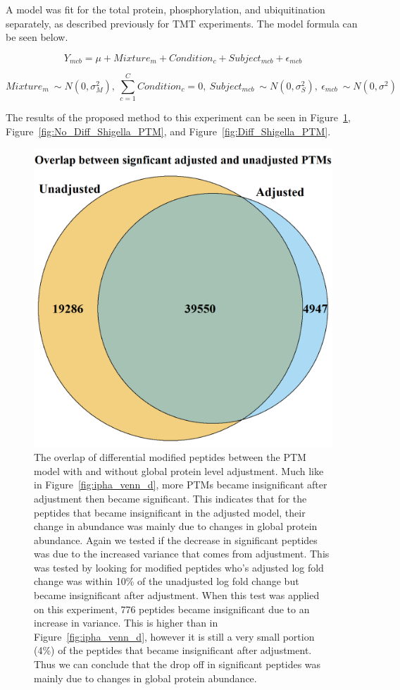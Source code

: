 \documentclass{mcp}
\def\sfigref#1{{Figure~\ref{#1}}}
\begin{document}
A model was fit for the total protein, phosphorylation, and ubiquitination separately, as described previously for TMT experiments. The model formula can be seen below.

$$Y_{mcb} = \mu + Mixture_m + Condition_c + Subject_{mcb} + \epsilon_{mcb}$$

$$Mixture_m ~ \sim N(0, \sigma^2_M) ,\: \sum_{c=1}^C{Condition_c} = 0 ,\: Subject_{mcb} ~ \sim N(0, \sigma^2_S) ,\: \epsilon_{mcb} ~ \sim N(0, \sigma^2)$$

The results of the proposed method to this experiment can be seen in \sfigref{fig:shig_venn_d},  \sfigref{fig:No_Diff_Shigella_PTM}, and \sfigref{fig:Diff_Shigella_PTM}.

\begin{figure}[h!]
\centering
\includegraphics[height=.65\textwidth]{sim_new/shig_venn_diagramm.png}
\caption{The overlap of differential modified peptides between the PTM model with and without global protein level adjustment. Much like in \sfigref{fig:ipha_venn_d}, more PTMs became insignificant after adjustment then became significant. This indicates that for the peptides that became insignificant in the adjusted model, their change in abundance was mainly due to changes in global protein abundance. Again we tested if the decrease in significant peptides was due to the increased variance that comes from adjustment. This was tested by looking for modified peptides who's adjusted log fold change was within 10\% of the unadjusted log fold change but became insignificant after adjustment. When this test was applied on this experiment, 776 peptides became insignificant due to an increase in variance. This is higher than in \sfigref{fig:ipha_venn_d}, however it is still a very small portion (4\%) of the peptides that became insignificant after adjustment. Thus we can conclude that the drop off in significant peptides was mainly due to changes in global protein abundance.}
\label{fig:shig_venn_d}
\end{figure}
\end{document}
